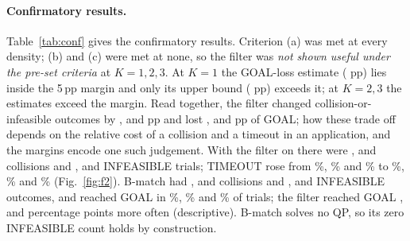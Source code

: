 \documentclass[journal]{IEEEtran}
\begin{document}
\paragraph{Confirmatory results.} Table~\ref{tab:conf} gives the confirmatory results. Criterion (a)
was met at every density; (b) and (c) were met at none, so the filter was \emph{not shown useful under
the pre-set criteria} at $K=1,2,3$. At $K=1$ the GOAL-loss estimate (\Blossone{} pp) lies inside the
5\,pp margin and only its upper bound (\Bupperone{} pp) exceeds it; at $K=2,3$ the estimates exceed the
margin. Read together, the filter changed collision-or-infeasible outcomes by \Adiffone, \Adifftwo{}
and \Adiffthree{} pp and lost \Blossone, \Blosstwo{} and \Blossthree{} pp of GOAL; how these trade off
depends on the relative cost of a collision and a timeout in an application, and the margins encode one
such judgement. With the filter on there were \CollOnone, \CollOntwo{} and
\CollOnthree{} collisions and \InfOnone, \InfOntwo{} and \InfOnthree{} INFEASIBLE trials;
TIMEOUT rose from \TOoffone\%, \TOofftwo\% and \TOoffthree\% to \TOonone\%, \TOontwo\% and
\TOonthree\% (Fig.~\ref{fig:f2}). B-match had \CollBmone, \CollBmtwo{} and \CollBmthree{} collisions
and \InfBmone, \InfBmtwo{} and \InfBmthree{} INFEASIBLE outcomes, and reached GOAL in \GoalBmone\%,
\GoalBmtwo\% and \GoalBmthree\% of trials; the filter reached GOAL \OnMinusBmGoalone,
\OnMinusBmGoaltwo{} and \OnMinusBmGoalthree{} percentage points more often (descriptive). B-match
solves no QP, so its zero INFEASIBLE count holds by construction.
\end{document}
